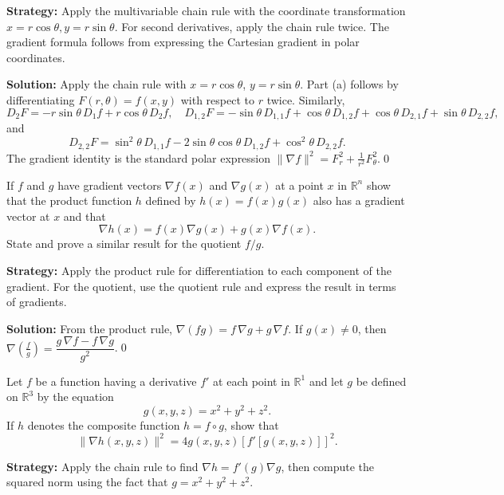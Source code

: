 \noindent\textbf{Strategy:} Apply the multivariable chain rule with the coordinate transformation \( x = r \cos \theta, y = r \sin \theta \). For second derivatives, apply the chain rule twice. The gradient formula follows from expressing the Cartesian gradient in polar coordinates.

\bigskip\noindent\textbf{Solution:}
Apply the chain rule with $x=r\cos\theta$, $y=r\sin\theta$. Part (a) follows by differentiating $F(r,\theta)=f(x,y)$ with respect to $r$ twice. Similarly,
\[D_2F=-r\sin\theta\,D_1f+r\cos\theta\,D_2f,\quad D_{1,2}F=-\sin\theta\,D_{1,1}f+\cos\theta\,D_{1,2}f+\cos\theta\,D_{2,1}f+\sin\theta\,D_{2,2}f,\]
and
\[D_{2,2}F=\sin^2\!\theta\,D_{1,1}f-2\sin\theta\cos\theta\,D_{1,2}f+\cos^2\!\theta\,D_{2,2}f.\]
The gradient identity is the standard polar expression $\|\nabla f\|^2=F_r^2+\tfrac{1}{r^2}F_\theta^2$.\qed


\begin{problembox}
If \( f \) and \( g \) have gradient vectors \( \nabla f(x) \) and \( \nabla g(x) \) at a point \( x \) in \( \mathbb{R}^n \) show that the product function \( h \) defined by \( h(x) = f(x)g(x) \) also has a gradient vector at \( x \) and that
\[\nabla h(x) = f(x)\nabla g(x) + g(x)\nabla f(x).\]
State and prove a similar result for the quotient \( f/g \).
\end{problembox}

\noindent\textbf{Strategy:} Apply the product rule for differentiation to each component of the gradient. For the quotient, use the quotient rule and express the result in terms of gradients.

\bigskip\noindent\textbf{Solution:}
From the product rule, $\nabla(fg)=f\,\nabla g+g\,\nabla f$. If $g(x)\ne0$, then $\nabla\!\left(\frac{f}{g}\right)=\dfrac{g\,\nabla f-f\,\nabla g}{g^2}$.\qed


\begin{problembox}
Let \( f \) be a function having a derivative \( f' \) at each point in \( \mathbb{R}^1 \) and let \( g \) be defined on \( \mathbb{R}^3 \) by the equation
\[g(x, y, z) = x^2 + y^2 + z^2.\]
If \( h \) denotes the composite function \( h = f \circ g \), show that
\[\| \nabla h(x, y, z) \|^2 = 4g(x, y, z)[f'[g(x, y, z)]]^2.\]
\end{problembox}

\noindent\textbf{Strategy:} Apply the chain rule to find \( \nabla h = f'(g) \nabla g \), then compute the squared norm using the fact that \( g = x^2 + y^2 + z^2 \).

